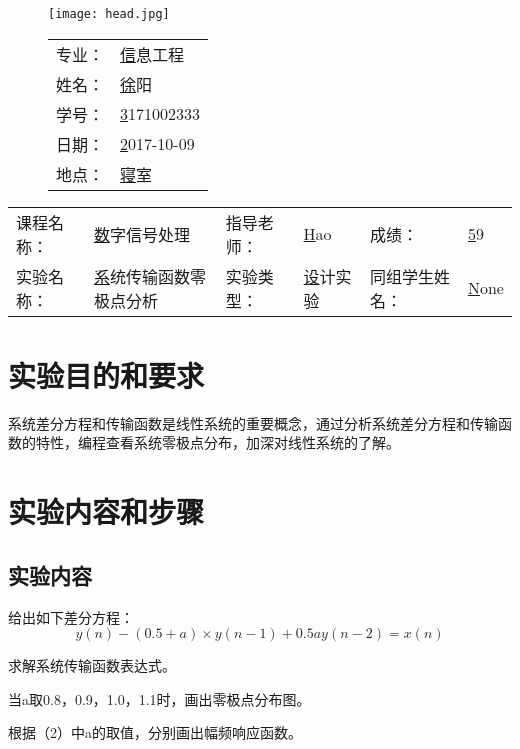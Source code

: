 \documentclass{zjureport}
\newcommand{\major}{信息工程}
\newcommand{\name}{徐阳}
\newcommand{\stuid}{3171002333}
\newcommand{\newdate}{2017-10-09}
\newcommand{\loc}{寝室}
\newcommand{\course}{数字信号处理}
\newcommand{\tutor}{Hao}
\newcommand{\grades}{59}
\newcommand{\newtitle}{系统传输函数零极点分析}
\newcommand{\exptype}{设计实验}
\newcommand{\group}{None}
\begin{document}
\thispagestyle{empty}
\begin{figure}[h]
  \begin{minipage}{0.6\linewidth}
    \centerline{\texttt{[image: head.jpg]}}
  \end{minipage}
  \hfill
  \begin{minipage}{.4\linewidth}
    \raggedleft
    \begin{tabular*}{.8\linewidth}{ll}
      专业： & \underline\major   \\
      姓名： & \underline\name    \\
      学号： & \underline\stuid   \\
      日期： & \underline\newdate \\
      地点： & \underline\loc
    \end{tabular*}
  \end{minipage}
\end{figure}

\begin{table}[!htbp]
  \centering
  \begin{tabular*}{\linewidth}{llllll}
    课程名称： & \underline\course   & 指导老师： & \underline\tutor   & 成绩：       &  \underline\grades \\
    实验名称： & \underline\newtitle & 实验类型： & \underline\exptype & 同组学生姓名：& \underline\group
  \end{tabular*}
\end{table}


\section{实验目的和要求}
  系统差分方程和传输函数是线性系统的重要概念，通过分析系统差分方程和传输函数的特性，编程查看系统零极点分布，加深对线性系统的了解。
\section{实验内容和步骤}

  \subsection{实验内容}

    给出如下差分方程：
    $$y(n) - (0.5+a)\times y(n-1) + 0.5ay(n-2) = x(n)$$
    \begin{clause}
      \item 求解系统传输函数表达式。
      \item 当a取0.8，0.9，1.0，1.1时，画出零极点分布图。
      \item 根据（2）中a的取值，分别画出幅频响应函数。
    \end{clause}
\end{document}
